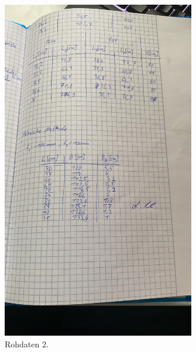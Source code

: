 \begin{figure}[H]
  \includegraphics[width=\textwidth, height=15cm, angle=270]{Bilder/Messdaten2.JPG}
  \caption{Rohdaten 2.}
\end{figure}



